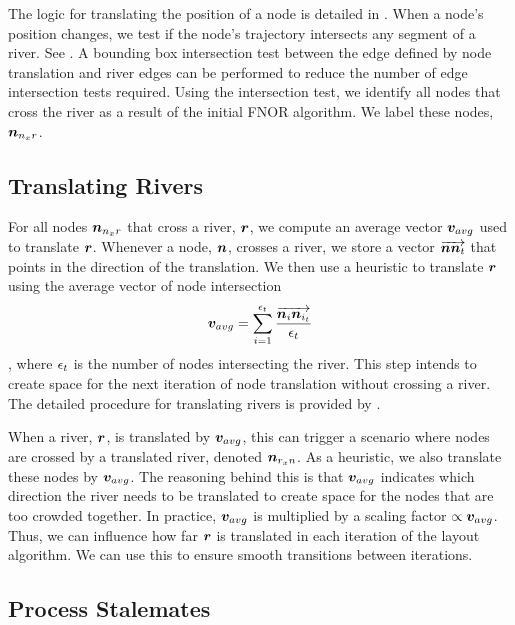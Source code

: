 The logic for translating the position of a node is detailed in . When a node's position changes, we test if the node's trajectory intersects any segment of a river. See . A bounding box intersection test between the edge defined by node translation and river edges can be performed to reduce the number of edge intersection tests required. Using the intersection test, we identify all nodes that cross the river as a result of the initial FNOR algorithm. We label these nodes, $ \bm{n}_{n_{x}r} $.

\subsection{Translating Rivers}

For all nodes $ \bm{n}_{n_{x}r} $ that cross a river, $ \bm{r} $, we compute an average vector $ \bm{v}_{avg} $ used to translate $ \bm{r} $. Whenever a node, $ \bm{n} $, crosses a river, we store a vector $ \protect\overrightarrow{\bm{n}\bm{n}_{t}} $ that points in the direction of the translation. We then use a heuristic to translate $ \bm{r} $ using the average vector of node intersection $$ \bm{v}_{avg} = \sum_{i=1}^{\epsilon_{t}} \frac{\protect\overrightarrow{\bm{n}_i\bm{n}_{i_t}}}{\epsilon_{t}} $$, where $ \epsilon_{t} $ is the number of nodes intersecting the river. This step intends to create space for the next iteration of node translation without crossing a river. The detailed procedure for translating rivers is provided by .


When a river, $ \bm{r} $, is translated by $ \bm{v}_{avg} $, this can trigger a scenario where nodes are crossed by a translated river, denoted $ \bm{n}_{r_{x}n} $. As a heuristic, we also translate these nodes by $ \bm{v}_{avg} $. The reasoning behind this is that $ \bm{v}_{avg} $ indicates which direction the river needs to be translated to create space for the nodes that are too crowded together. In practice, $ \bm{v}_{avg} $ is multiplied by a scaling factor $ \propto\bm{v}_{avg} $. Thus, we can influence how far $ \bm{r} $ is translated in each iteration of the layout algorithm. We can use this to ensure smooth transitions between iterations.

\subsection{Process Stalemates}

